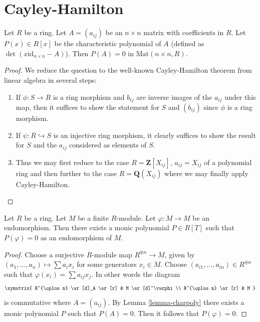 \section{Cayley-Hamilton}
\label{section-cayley-hamilton}

\begin{lemma}
\label{lemma-charpoly}
Let $R$ be a ring. Let $A = (a_{ij})$ be an $n \times n$
matrix with coefficients in $R$. Let $P(x) \in R[x]$
be the characteristic polynomial of $A$ (defined
as $\det(x\text{id}_{n \times n} - A)$).
Then $P(A) = 0$ in $\text{Mat}(n \times n, R)$.
\end{lemma}

\begin{proof}
We reduce the question to the well-known Cayley-Hamilton
theorem from linear algebra in several steps:
\begin{enumerate}
\item If $\phi :S \rightarrow R$ is a ring morphism and $b_{ij}$
are inverse images of the $a_{ij}$ under this map, then it suffices
to show the statement for $S$ and $(b_{ij})$ since $\phi$ is a ring morphism.
\item If $\psi :R \hookrightarrow S$ is an injective ring morphism, it
clearly suffices to show the result for $S$ and the $a_{ij}$ considered as
elements of $S$. 
\item Thus we may first reduce to the case $R = \mathbf{Z}[X_{ij}]$,
$a_{ij} = X_{ij}$ of a polynomial ring and then further to
the case $R = \mathbf{Q}(X_{ij})$ where we may finally apply Cayley-Hamilton.
\end{enumerate}
\end{proof}

\begin{lemma}
\label{lemma-charpoly-module}
Let $R$ be a ring.
Let $M$ be a finite $R$-module.
Let $\varphi : M \to M$ be an endomorphism.
Then there exists a monic polynomial $P \in R[T]$ such that
$P(\varphi) = 0$ as an endomorphism of $M$.
\end{lemma}

\begin{proof}
Choose a surjective $R$-module map $R^{\oplus n} \to M$, given by
$(a_1, \ldots, a_n) \mapsto \sum a_ix_i$ for some generators $x_i \in M$.
Choose $(a_{i1}, \ldots, a_{in}) \in R^{\oplus n}$ such that
$\varphi(x_i) = \sum a_{ij} x_j$. In other words the diagram
$$
\xymatrix{
R^{\oplus n} \ar[d]_A \ar[r] & M \ar[d]^\varphi \\
R^{\oplus n} \ar[r] & M
}
$$
is commutative where $A = (a_{ij})$. By
Lemma \ref{lemma-charpoly}
there exists a monic polynomial $P$ such that $P(A) = 0$.
Then it follows that $P(\varphi) = 0$.
\end{proof}

